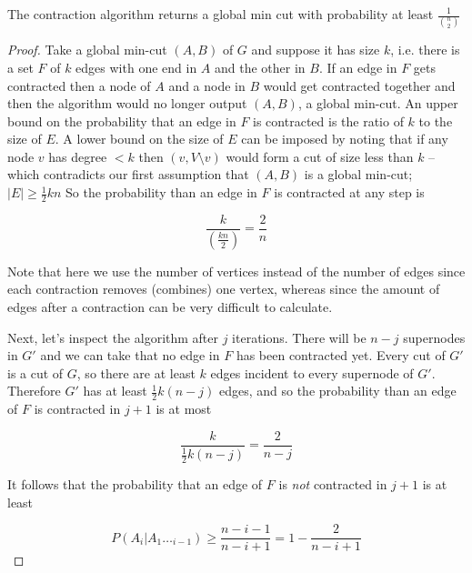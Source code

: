 \documentclass[../notes.tex]{subfiles}
\begin{document}
\begin{lemma}
  The contraction algorithm returns a global min cut with probability at least $ \frac{1}{\binom{n}{2}} $
  \begin{proof}
    Take a global min-cut $ (A, B) $ of $ G $ and suppose it has size $ k $, i.e. there is a set $ F $ of $ k $ edges with one end in $ A $ and the other in $ B $.
    If an edge in $ F $ gets contracted then a node of $ A$ and a node in $ B $ would get contracted together and then the algorithm would no longer output $ (A, B) $, a global min-cut.
    An upper bound on the probability that an edge in $ F $ is contracted is the ratio of $ k $ to the size of $ E $. A lower bound on the size of $ E $ can be imposed by noting that if any node $ v $ has degree $ < k $ then $ ({v}, V\setminus {v}) $ would form a cut of size less than $ k $ -- which contradicts our first assumption that $ (A,B) $ is a global min-cut; $ |E| \ge \frac{1}{2}kn $
    So the probability than an edge in $ F $ is contracted at any step is

    \begin{equation}
      \frac{k}{(\frac{kn}{2})} = \frac{2}{n}
    \end{equation}

    Note that here we use the number of vertices instead of the number of edges since each contraction removes (combines) one vertex, whereas since the amount of edges after a contraction can be very difficult to calculate.

    Next, let's inspect the algorithm after $ j $ iterations. 
    There will be $ n-j $ supernodes in $ G' $ and we can take that no edge in $ F $ has been contracted yet. 
    Every cut of $ G' $ is a cut of $ G $, so there are at least $ k $ edges incident to every supernode of $ G' $. Therefore $ G' $ has at least $ \frac{1}{2}k(n-j) $ edges, and so the probability than an edge of $ F $ is contracted in $ j+1 $ is at most

    \begin{equation}
      \frac{k}{\frac{1}{2}k(n-j)} = \frac{2}{n-j}
    \end{equation}

    It follows that the probability that an edge of $ F $ is \textit{not} contracted in $ j+1 $ is at least

  \begin{equation}
    P(A_i | A_1\ldots_{i-1}) \ge \frac{n-i-1}{n-i+1} = 1 - \frac{2}{n-i+1}
  \end{equation}



\end{proof}
\end{lemma}
\end{document}
